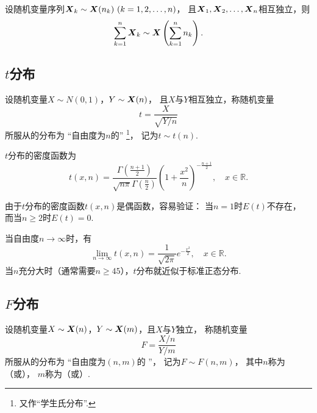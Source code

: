 \begin{corollary}\label{theorem:数理统计的基础知识.卡方分布的可加性2}
设随机变量序列\(\x_k \sim \x(n_k)\ (k=1,2,\dotsc,n)\)，
且\(\boldsymbol{X}_1,\boldsymbol{X}_2,\dotsc,\boldsymbol{X}_n\)相互独立，则\begin{equation}
	\sum\limits_{k=1}^n \boldsymbol{X}_k \sim \boldsymbol{X}\left(\sum\limits_{k=1}^n{n_k}\right).
\end{equation}
\end{corollary}

\subsection{\texorpdfstring{\(t\)}{t}分布}
\begin{definition}
设随机变量\(X \sim N(0,1)\)，\(Y \sim \boldsymbol{X}(n)\)，
且\(X\)与\(Y\)相互独立，称随机变量\begin{equation}
	t = \frac{X}{\sqrt{Y/n}}
\end{equation}
所服从的分布为
“自由度为\(n\)的”
\footnote{又作“学生氏分布”.}，
记为\(t \sim t(n)\).
\end{definition}

\begin{theorem}\label{theorem:数理统计的基础知识.学生氏分布的密度函数}
\(t\)分布的密度函数为\begin{equation}
	t(x,n) = \frac{
		\Gamma\left(\frac{n+1}{2}\right)
	}{
		\sqrt{n\pi} \Gamma\left(\frac{n}{2}\right)
	}
	\left(1+\frac{x^2}{n}\right)^{-\frac{n+1}{2}},
	\quad x \in \mathbb{R}.
\end{equation}
\end{theorem}

由于\(t\)分布的密度函数\(t(x,n)\)是偶函数，容易验证：
当\(n=1\)时\(E(t)\)不存在，
而当\(n \geq 2\)时\(E(t)=0\).

当自由度\(n\to\infty\)时，有\[
	\lim\limits_{n\to\infty} t(x,n) = \frac{1}{\sqrt{2\pi}} e^{-\frac{x^2}{2}},
	\quad x \in \mathbb{R}.
\]
当\(n\)充分大时（通常需要\(n \geq 45\)），\(t\)分布就近似于标准正态分布.

\subsection{\texorpdfstring{\(F\)}{F}分布}
\begin{definition}
设随机变量\(X \sim \boldsymbol{X}(n)\)，\(Y \sim \boldsymbol{X}(m)\)，且\(X\)与\(Y\)独立，
称随机变量\begin{equation}
	F=\frac{X/n}{Y/m}
\end{equation}
所服从的分布为
“自由度为\((n,m)\)的 ”，
记为\(F \sim F(n,m)\)，
其中\(n\)称为（或），
\(m\)称为（或）.
\end{definition}

